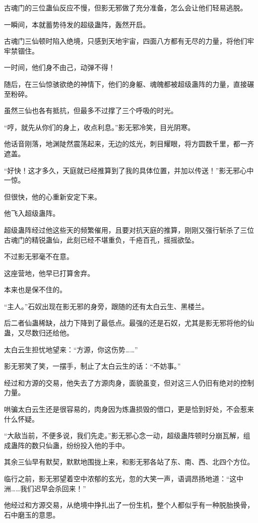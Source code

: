 \begin{this_body}
古魂门的三位蛊仙反应不慢，但影无邪做了充分准备，怎么会让他们轻易逃脱。

一瞬间，本就蓄势待发的超级蛊阵，轰然开启。

古魂门三仙顿时陷入绝境，只感到天地宇宙，四面八方都有无尽的力量，将他们牢牢禁锢住。

一时间，他们身不由己，动弹不得！

随后，在三仙惊骇欲绝的神情下，他们的身躯、魂魄都被超级蛊阵的力量，直接碾至粉碎。

虽然三仙也各有抵抗，但最多不过撑了三个呼吸的时光。

“哼，就先从你们的身上，收点利息。”影无邪冷笑，目光阴寒。

他话音刚落，地渊陡然震荡起来，无边的炫光，刺目耀眼，将方圆数千里，都一齐遮盖。

“好快！这才多久，天庭就已经推算到了我的具体位置，并加以传送！”影无邪心中一惊。

但很快，他的心重新安定下来。

他飞入超级蛊阵。

超级蛊阵经过他这些天的频繁催用，且要对抗天庭的推算，刚刚又强行斩杀了三位古魂门的精锐蛊仙，此刻已经不堪重负，千疮百孔，摇摇欲坠。

不过影无邪毫不在意。

这座营地，他早已打算舍弃。

本来也是保不住的。

“主人。”石奴出现在影无邪的身旁，跟随的还有太白云生、黑楼兰。

后二者仙蛊稀缺，战力下降到了最低点。最强的还是石奴，尤其是影无邪将他的仙蛊，又尽数归还给他。

太白云生担忧地望来：“方源，你这伤势……”

影无邪笑了笑，一摆手，制止了太白云生的话：“不妨事。”

经过和方源的交易，他失去了方源肉身，面貌虽变，但对这三人仍旧有绝对的控制力量。

哄骗太白云生还是很容易的，肉身因为炼蛊损毁的借口，更是恰到好处，不会惹来什么怀疑。

“大敌当前，不便多说，我们先走。”影无邪心念一动，超级蛊阵顿时分崩瓦解，组成蛊阵的数只仙蛊，纷纷投入他的手中。

其余三仙早有默契，默默地围拢上来，和影无邪各站了东、南、西、北四个方位。

临行之前，影无邪望着空中浓郁的玄光，忽的大笑一声，语调昂扬地道：“这中洲……我们迟早会杀回来！”

他经过和方源交易，从绝境中挣扎出了一份生机，整个人都似乎有一种脱胎换骨，石中磨玉的意思。


\end{this_body}
